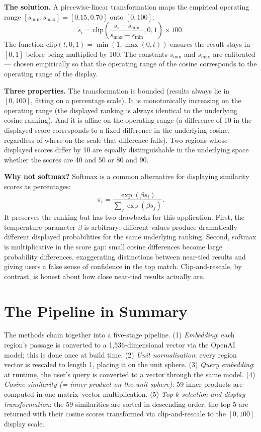 \documentclass[11pt]{article}
\begin{document}
\textbf{The solution.} A piecewise-linear transformation maps the empirical operating range $[s_{\min}, s_{\max}] = [0.15, 0.70]$ onto $[0, 100]$:
\[
\tilde{s}_i = \mathrm{clip}\!\left(\frac{s_i - s_{\min}}{s_{\max} - s_{\min}}, 0, 1\right) \times 100.
\]
The function $\mathrm{clip}(t, 0, 1) = \min(1, \max(0, t))$ ensures the result stays in $[0, 1]$ before being multiplied by 100. The constants $s_{\min}$ and $s_{\max}$ are calibrated --- chosen empirically so that the operating range of the cosine corresponds to the operating range of the display.

\textbf{Three properties.} The transformation is bounded (results always lie in $[0, 100]$, fitting on a percentage scale). It is monotonically increasing on the operating range (the displayed ranking is always identical to the underlying cosine ranking). And it is affine on the operating range (a difference of 10 in the displayed score corresponds to a fixed difference in the underlying cosine, regardless of where on the scale that difference falls). Two regions whose displayed scores differ by 10 are equally distinguishable in the underlying space whether the scores are 40 and 50 or 80 and 90.

\textbf{Why not softmax?} Softmax is a common alternative for displaying similarity scores as percentages:
\[
\pi_i = \frac{\exp(\beta s_i)}{\sum_j \exp(\beta s_j)}.
\]
It preserves the ranking but has two drawbacks for this application. First, the temperature parameter $\beta$ is arbitrary; different values produce dramatically different displayed probabilities for the same underlying ranking. Second, softmax is multiplicative in the score gap: small cosine differences become large probability differences, exaggerating distinctions between near-tied results and giving users a false sense of confidence in the top match. Clip-and-rescale, by contrast, is honest about how close near-tied results actually are.

\section{The Pipeline in Summary}

The methods chain together into a five-stage pipeline. (1) \emph{Embedding}: each region's passage is converted to a 1{,}536-dimensional vector via the OpenAI model; this is done once at build time. (2) \emph{Unit normalisation}: every region vector is rescaled to length 1, placing it on the unit sphere. (3) \emph{Query embedding}: at runtime, the user's query is converted to a vector through the same model. (4) \emph{Cosine similarity (= inner product on the unit sphere)}: 59 inner products are computed in one matrix--vector multiplication. (5) \emph{Top-$k$ selection and display transformation}: the 59 similarities are sorted in descending order; the top 5 are returned with their cosine scores transformed via clip-and-rescale to the $[0, 100]$ display scale.
\end{document}
